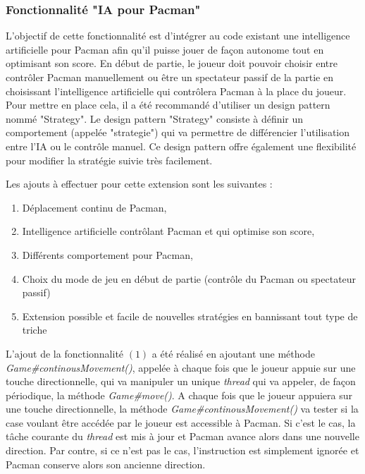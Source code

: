 \documentclass[12pt, openany]{report}
\begin{document}
\subsubsection{Fonctionnalité "IA pour Pacman"}

L'objectif de cette fonctionnalité est d'intégrer au code existant une intelligence artificielle pour Pacman afin qu'il puisse jouer de façon autonome tout en optimisant son score. En début de partie, le joueur doit pouvoir choisir entre contrôler Pacman manuellement ou être un spectateur passif de la partie en choisissant l'intelligence artificielle qui contrôlera Pacman à la place du joueur. Pour mettre en place cela, il a été recommandé d'utiliser un design pattern nommé "Strategy". Le design pattern "Strategy" consiste à définir un comportement (appelée "strategie") qui va permettre de différencier l'utilisation entre l'IA ou le contrôle manuel. Ce design pattern offre également une flexibilité pour modifier la stratégie suivie très facilement.

Les ajouts à effectuer pour cette extension sont les suivantes :
\begin{enumerate}
	\item Déplacement continu de Pacman,
	\item Intelligence artificielle contrôlant Pacman et qui optimise son score,
	\item Différents comportement pour Pacman,
	\item Choix du mode de jeu en début de partie (contrôle du Pacman ou spectateur passif)
	\item Extension possible et facile de nouvelles stratégies en bannissant tout type de triche \\
	
\end{enumerate} 

L'ajout de la fonctionnalité $(1)$ a été réalisé en ajoutant une méthode \mbox{\textit{Game\#continousMovement()}}, appelée à chaque fois que le joueur appuie sur une touche directionnelle, qui va manipuler un unique \textit{thread} qui va appeler, de façon périodique, la méthode \mbox{\textit{Game\#move()}}. A chaque fois que le joueur appuiera sur une touche directionnelle, la méthode \mbox{\textit{Game\#continousMovement()}} va tester si la case voulant être accédée par le joueur est accessible à Pacman. Si c'est le cas, la tâche courante du \textit{thread} est mis à jour et Pacman avance alors dans une nouvelle direction. Par contre, si ce n'est pas le cas, l'instruction est simplement ignorée et Pacman conserve alors son ancienne direction. 
\end{document}
